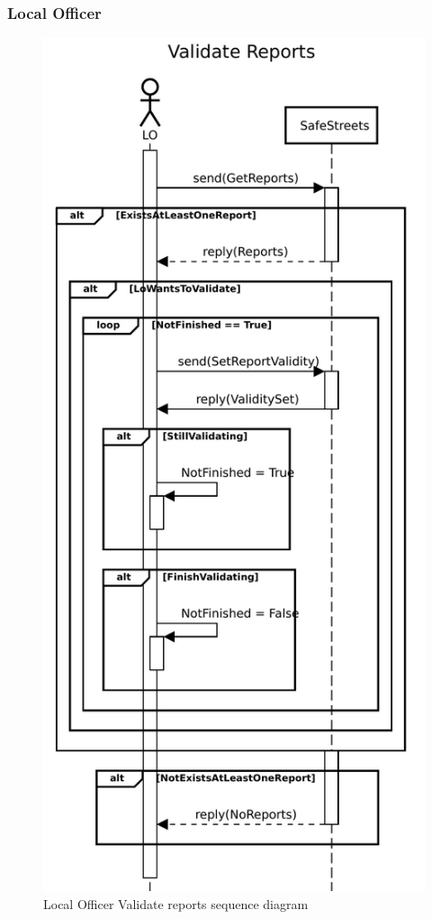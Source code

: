 					\subsubsection{Local Officer}
						\begin{figure}[!h]
								\centering
							\includegraphics[height=0.8\textheight] {images/SequenceDiagram/Authority/LO/ValidateReport.pdf}
								\caption{Local Officer Validate reports sequence diagram}
						\end{figure}
				\clearpage

